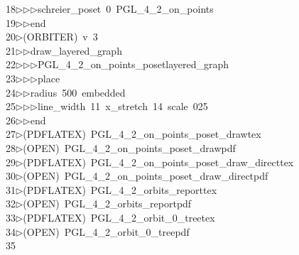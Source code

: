 \begin{tabbing}
18\>$\triangleright$\>$\triangleright$\>$\triangleright$\>schreier\_poset\ 0\ PGL\_4\_2\_on\_points\ \\[0pt]
19\>$\triangleright$\>$\triangleright$\>end\\[0pt]
20\>$\triangleright$\>(ORBITER)\ v\ 3\ \\[0pt]
21\>$\triangleright$\>$\triangleright$\>draw\_layered\_graph\ \\[0pt]
22\>$\triangleright$\>$\triangleright$\>$\triangleright$\>PGL\_4\_2\_on\_points\_posetlayered\_graph\ \\[0pt]
23\>$\triangleright$\>$\triangleright$\>$\triangleright$\>place\ \\[0pt]
24\>$\triangleright$\>$\triangleright$\>radius\ 500\ embedded\ \\[0pt]
25\>$\triangleright$\>$\triangleright$\>$\triangleright$\>line\_width\ 11\ x\_stretch\ 14\ scale\ 025\ \\[0pt]
26\>$\triangleright$\>$\triangleright$\>end\\[0pt]
27\>$\triangleright$\>(PDFLATEX)\ PGL\_4\_2\_on\_points\_poset\_drawtex\\[0pt]
28\>$\triangleright$\>(OPEN)\ PGL\_4\_2\_on\_points\_poset\_drawpdf\\[0pt]
29\>$\triangleright$\>(PDFLATEX)\ PGL\_4\_2\_on\_points\_poset\_draw\_directtex\\[0pt]
30\>$\triangleright$\>(OPEN)\ PGL\_4\_2\_on\_points\_poset\_draw\_directpdf\\[0pt]
31\>$\triangleright$\>(PDFLATEX)\ PGL\_4\_2\_orbits\_reporttex\\[0pt]
32\>$\triangleright$\>(OPEN)\ PGL\_4\_2\_orbits\_reportpdf\\[0pt]
33\>$\triangleright$\>(PDFLATEX)\ PGL\_4\_2\_orbit\_0\_treetex\\[0pt]
34\>$\triangleright$\>(OPEN)\ PGL\_4\_2\_orbit\_0\_treepdf\\[0pt]
35\>\end{tabbing}
